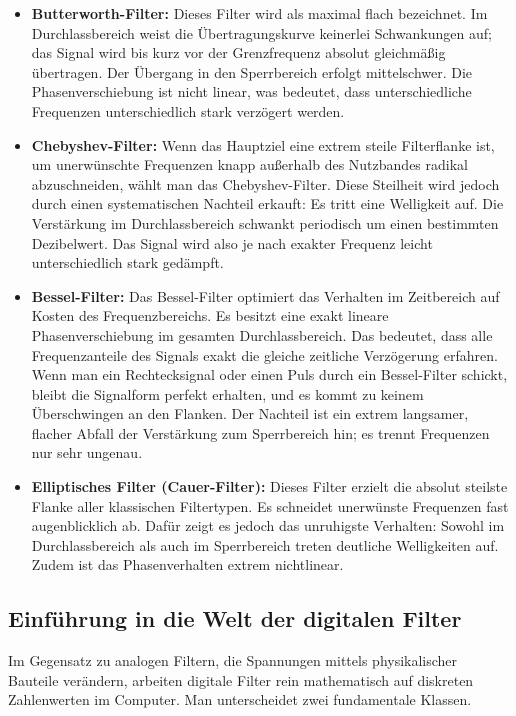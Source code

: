 \documentclass[11pt,a4paper]{article}
\begin{document}
\begin{itemize}
    \item \textbf{Butterworth-Filter:} Dieses Filter wird als maximal flach bezeichnet. Im Durchlassbereich weist die Übertragungskurve keinerlei Schwankungen auf; das Signal wird bis kurz vor der Grenzfrequenz absolut gleichmäßig übertragen. Der Übergang in den Sperrbereich erfolgt mittelschwer. Die Phasenverschiebung ist nicht linear, was bedeutet, dass unterschiedliche Frequenzen unterschiedlich stark verzögert werden.
    \item \textbf{Chebyshev-Filter:} Wenn das Hauptziel eine extrem steile Filterflanke ist, um unerwünschte Frequenzen knapp außerhalb des Nutzbandes radikal abzuschneiden, wählt man das Chebyshev-Filter. Diese Steilheit wird jedoch durch einen systematischen Nachteil erkauft: Es tritt eine Welligkeit auf. Die Verstärkung im Durchlassbereich schwankt periodisch um einen bestimmten Dezibelwert. Das Signal wird also je nach exakter Frequenz leicht unterschiedlich stark gedämpft.
    \item \textbf{Bessel-Filter:} Das Bessel-Filter optimiert das Verhalten im Zeitbereich auf Kosten des Frequenzbereichs. Es besitzt eine exakt lineare Phasenverschiebung im gesamten Durchlassbereich. Das bedeutet, dass alle Frequenzanteile des Signals exakt die gleiche zeitliche Verzögerung erfahren. Wenn man ein Rechtecksignal oder einen Puls durch ein Bessel-Filter schickt, bleibt die Signalform perfekt erhalten, und es kommt zu keinem Überschwingen an den Flanken. Der Nachteil ist ein extrem langsamer, flacher Abfall der Verstärkung zum Sperrbereich hin; es trennt Frequenzen nur sehr ungenau.
    \item \textbf{Elliptisches Filter (Cauer-Filter):} Dieses Filter erzielt die absolut steilste Flanke aller klassischen Filtertypen. Es schneidet unerwünste Frequenzen fast augenblicklich ab. Dafür zeigt es jedoch das unruhigste Verhalten: Sowohl im Durchlassbereich als auch im Sperrbereich treten deutliche Welligkeiten auf. Zudem ist das Phasenverhalten extrem nichtlinear.
\end{itemize}

\subsection{Einführung in die Welt der digitalen Filter}

Im Gegensatz zu analogen Filtern, die Spannungen mittels physikalischer Bauteile verändern, arbeiten digitale Filter rein mathematisch auf diskreten Zahlenwerten im Computer. Man unterscheidet zwei fundamentale Klassen.
\end{document}

